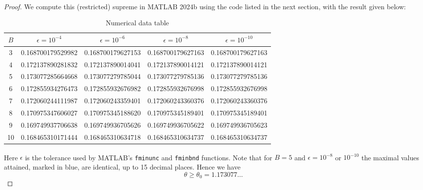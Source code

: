 \documentclass[12 pt]{article}
\begin{document}
\begin{proof}
We compute this (restricted) supreme in MATLAB\textsuperscript{\textregistered} 2024b
using the code listed in the next section, with the result given below:
\begin{table}[H]
\centering
\begin{tabular}{|c|c|c|c|c|}
\hline
$B$ & $\epsilon=10^{-4}$ & $\epsilon=10^{-6}$ & $\epsilon=10^{-8}$ & $\epsilon=10^{-10}$ \\
\hline
3 & 0.168700179529982 & 0.168700179627153 & 0.168700179627163 & 0.168700179627163 \\
\hline
4 & 0.172137890281832 & 0.172137890014041 & 0.172137890014121 & 0.172137890014121 \\
\hline
5 & 0.173077285664668 & 0.173077279785044 & {\color{blue}0.173077279785136} & {\color{blue}0.173077279785136} \\
\hline
6 & 0.172855934276473 & 0.172855932676982 & 0.172855932676998 & 0.172855932676998 \\
\hline
7 & 0.172060244111987 & 0.172060243359401 & 0.172060243360376 & 0.172060243360376 \\
\hline
8 & 0.170975347606027 & 0.170975345188620 & 0.170975345189401 & 0.170975345189401 \\
\hline
9 & 0.169749937706638 & 0.169749936705626 & 0.169749936705622 & 0.169749936705623 \\
\hline
10& 0.168465310171444 & 0.168465310634718 & 0.168465310634737 & 0.168465310634737 \\
\hline
\end{tabular}
\caption{Numerical data table}
\end{table}
Here $\epsilon$ is the tolerance used by MATLAB\textsuperscript{\textregistered}'s \texttt{fminunc} and \texttt{fminbnd} functions. Note that for $B = 5$ and $\epsilon = 10^{-8}$ or $10^{-10}$ the maximal values attained, marked in blue, are identical, up to 15 decimal places. Hence we have
\[
\theta \ge \theta_0 = 1.173077\dots
\]
\end{proof}
\end{document}
